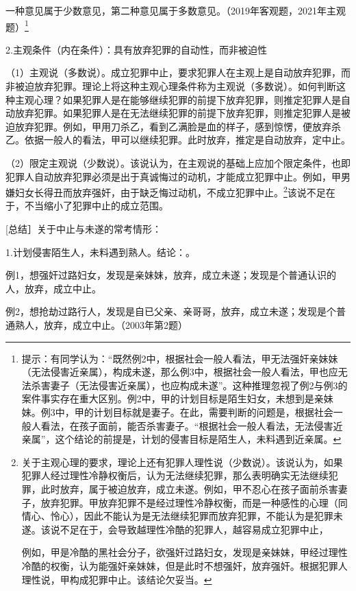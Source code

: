 一种意见属于少数意见，第二种意见属于多数意见。（2019年客观题，2021年主观题）\footnote{提示：有同学认为：“既然例2中，根据社会一般人看法，甲无法强奸亲妹妹（无法侵害近亲属），构成未遂，那么例3中，根据社会一般人看法，甲也应无法杀害妻子（无法侵害近亲属），也应构成未遂”。这种推理忽视了例2与例3的案件事实存在重大区别。例2中，甲的计划目标是陌生妇女，未想到是亲妹妹。例3中，甲的计划目标就是妻子。在此，需要判断的问题是，根据社会一般人看法，在孩子面前，能否杀害妻子。“根据社会一般人看法，无法侵害近亲属”，这个结论的前提是，计划的侵害目标是陌生人，未料遇到近亲属。}

2.主观条件（内在条件）：具有放弃犯罪的自动性，而非被迫性

（1）主观说（多数说）。成立犯罪中止，要求犯罪人在主观上是自动放弃犯罪，而非被迫放弃犯罪。理论上将这种主观心理条件称为主观说（多数说）。如何判断这种主观心理？如果犯罪人是在能够继续犯罪的前提下放弃犯罪，则推定犯罪人是自动放弃犯罪。如果犯罪人是在无法继续犯罪的前提下放弃犯罪，则推定犯罪人是被迫放弃犯罪。例如，甲用刀杀乙，看到乙满脸是血的样子，感到惊愣，便放弃杀乙。依据一般人的看法，甲可以继续犯罪。此时放弃，推定是自动放弃，定中止。

（2）限定主观说（少数说）。该说认为，在主观说的基础上应加个限定条件，也即犯罪人自动放弃犯罪必须是出于真诚悔过的动机，才能成立犯罪中止。例如，甲男嫌妇女长得丑而放弃强奸，由于缺乏悔过动机，不成立犯罪中止。\footnote{关于主观心理的要求，理论上还有犯罪人理性说（少数说）。该说认为，如果犯罪人经过理性冷静权衡后，认为无法继续犯罪，那么表明确实无法继续犯罪，此时放弃，属于被迫放弃，成立未遂。例如，甲不忍心在孩子面前杀害妻子，放弃犯罪。甲放弃犯罪不是经过理性冷静权衡，而是一种感性的心理（同情心、怜心），因此不能认为是无法继续犯罪而放弃犯罪，不能认为是犯罪未遂。该说不足在于，会导致越理性冷酷的犯罪人，越容易成立犯罪中止，

例如，甲是冷酷的黑社会分子，欲强奸过路妇女，发现是亲妹妹，甲经过理性冷酷的权衡，认为能强奸亲妹妹，但是此时不想强奸，放弃强奸。根据犯罪人理性说，甲构成犯罪中止。该结论欠妥当。}该说不足在于，不当缩小了犯罪中止的成立范围。

[总结］关于中止与未遂的常考情形：

1.计划侵害陌生人，未料遇到熟人。结论：。

例1，想强奸过路妇女，发现是亲妹妹，放弃，成立未遂；发现是个普通认识的人，放弃，成立中止。

例2，想抢劫过路行人，发现是自已父亲、亲哥哥，放弃，成立未遂；发现是个普通熟人，放弃，成立中止。（2003年第2题）

